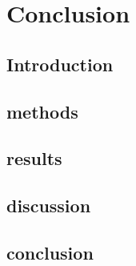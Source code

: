 \documentclass[../main.tex]{subfiles}
\begin{document}
\chapter{Conclusion}
\minitoc \mtcskip 

\section{Introduction}
\section{methods}
\section{results}
\section{discussion}
\section{conclusion}
\end{document}
